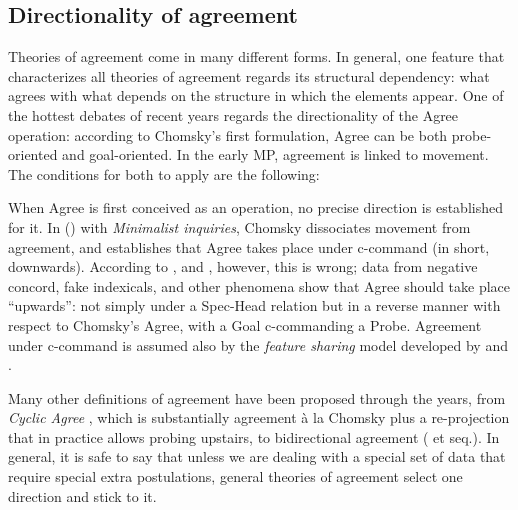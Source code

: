 \documentclass[output=paper
,modfonts
,nonflat]{langsci/langscibook}
\begin{document}
\subsection{Directionality of agreement}\label{sec-dalessandro:4.1}
Theories of agreement come in many different forms. In general, one feature that characterizes all theories of agreement regards its structural dependency: what agrees with what depends on the structure in which the elements appear. One of the hottest debates of recent years regards the directionality of the Agree operation: according to Chomsky’s first formulation, Agree can be both probe-oriented and goal-oriented. In the early MP, agreement is linked to movement. The conditions for both to apply are the following:

When Agree is first conceived as an operation, no precise direction is established for it. In (\citeyear{Chomsky2000}) with \textit{Minimalist inquiries}, Chomsky dissociates movement from agreement, and establishes that Agree takes place under c-command (in short, downwards). According to \citet{Zeijlstra2012}, \citet{Bjorkman_ZeijlstraTA} and \citet{Wurmbrand2012, Wurmbrand2014, Wurmbrand2017}, however, this is wrong; data from negative concord, fake indexicals, and other phenomena show that Agree should take place “upwards”: not simply under a Spec-Head relation but in a reverse manner with respect to Chomsky’s Agree, with a Goal c-commanding a Probe. Agreement under c-command is assumed also by the \textit{feature sharing} model developed by \citet{Pesetsky_Torrego2007} and \citet{Preminger2012, Preminger2013, Preminger2014}.

Many other definitions of agreement have been proposed through the years, from \textit{Cyclic Agree} \citep{Bejar_Rezac2009}, which is substantially agreement à la Chomsky plus a re-projection that in practice allows probing upstairs, to bidirectional agreement (\citealt{Boskovic2007} et seq.). In general, it is safe to say that unless we are dealing with a special set of data that require special extra postulations, general theories of agreement select one direction and stick to it.
\end{document}
